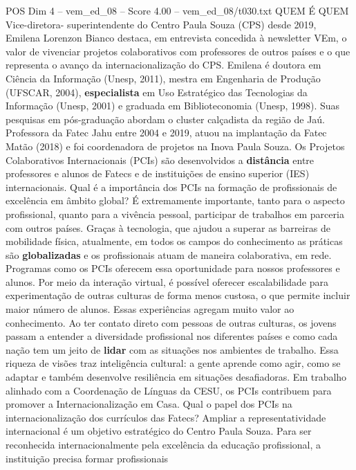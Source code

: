 \begin{textsample}{POS Dim 4 – vem\_ed\_08 – Score 4.00 – vem\_ed\_08/t030.txt}  \label{ex:f4_pos_132}
QUEM É QUEM Vice-diretora- superintendente do Centro Paula Souza (CPS) desde 2019, Emilena Lorenzon Bianco destaca, em entrevista concedida à newsletter VEm, o valor de vivenciar projetos colaborativos com professores de outros países e o que representa o avanço da internacionalização do CPS.
Emilena é doutora em Ciência da Informação (Unesp, 2011), mestra em Engenharia de Produção (UFSCAR, 2004), \textbf{especialista} em Uso Estratégico das Tecnologias da Informação (Unesp, 2001) e graduada em Biblioteconomia (Unesp, 1998).
Suas pesquisas em pós-graduação abordam o cluster calçadista da região de Jaú.
Professora da Fatec Jahu entre 2004 e 2019, atuou na implantação da Fatec Matão (2018) e foi coordenadora de projetos na Inova Paula Souza.
Os Projetos Colaborativos Internacionais (PCIs) são desenvolvidos a \textbf{distância} entre professores e alunos de Fatecs e de instituições de ensino superior (IES) internacionais.
Qual é a importância dos PCIs na formação de profissionais de excelência em âmbito global?
É extremamente importante, tanto para o aspecto profissional, quanto para a vivência pessoal, participar de trabalhos em parceria com outros países.
Graças à tecnologia, que ajudou a superar as barreiras de mobilidade física, atualmente, em todos os campos do conhecimento as práticas são \textbf{globalizadas} e os profissionais atuam de maneira colaborativa, em rede.
Programas como os PCIs oferecem essa oportunidade para nossos professores e alunos.
Por meio da interação virtual, é possível oferecer escalabilidade para experimentação de outras culturas de forma menos custosa, o que permite incluir maior número de alunos.
Essas experiências agregam muito valor ao conhecimento.
Ao ter contato direto com pessoas de outras culturas, os jovens passam a entender a diversidade profissional nos diferentes países e como cada nação tem um jeito de \textbf{lidar} com as situações nos ambientes de trabalho.
Essa riqueza de visões traz inteligência cultural: a gente aprende como agir, como se adaptar e também desenvolve resiliência em situações desafiadoras.
Em trabalho alinhado com a Coordenação de Línguas da CESU, os PCIs contribuem para promover a Internacionalização em Casa.
Qual o papel dos PCIs na internacionalização dos currículos das Fatecs?
Ampliar a representatividade internacional é um objetivo estratégico do Centro Paula Souza.
Para ser reconhecida internacionalmente pela excelência da educação profissional, a instituição precisa formar profissionais

\end{textsample}
